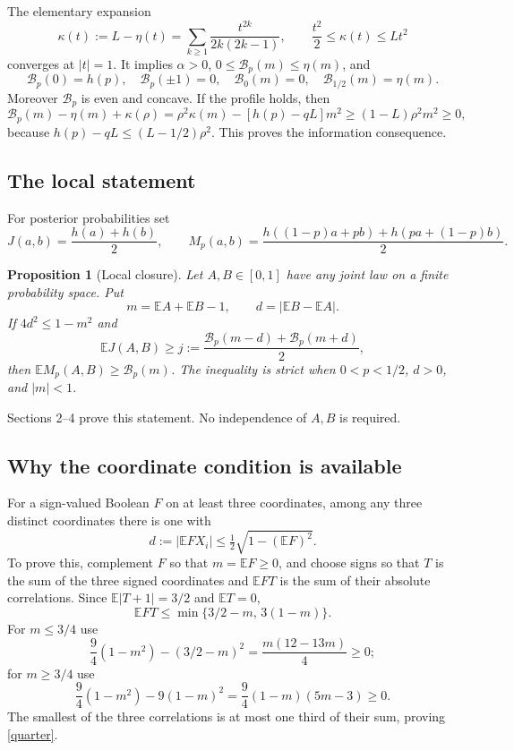 \documentclass[11pt]{article}
\newtheorem{proposition}[theorem]{Proposition}
\newcommand{\E}{\mathbb E}\newcommand{\Prb}{\mathbb P}
\newcommand{\B}{\mathcal B_p}\newcommand{\dd}{\,\mathrm d}
\numberwithin{equation}{section}
\begin{document}
The elementary expansion
\begin{equation}\label{entropyseries}
 \kappa(t):=L-\eta(t)=\sum_{k\ge1}\frac{t^{2k}}{2k(2k-1)},
 \qquad \frac{t^2}{2}\le\kappa(t)\le Lt^2
\end{equation}
converges at $|t|=1$. It implies $\alpha>0$, $0\le\B(m)\le\eta(m)$, and
\[
 \B(0)=h(p),\quad \B(\pm1)=0,\quad
 \mathcal B_0(m)=0,\quad\mathcal B_{1/2}(m)=\eta(m).
\]
Moreover $\B$ is even and concave. If the profile holds, then
\[
 \B(m)-\eta(m)+\kappa(\rho)
 =\rho^2\kappa(m)-[h(p)-qL]m^2
 \ge(1-L)\rho^2m^2\ge0,
\]
because $h(p)-qL\le(L-1/2)\rho^2$. This proves the information consequence.

\subsection*{The local statement}
For posterior probabilities set
\[
 J(a,b)=\frac{h(a)+h(b)}2,\qquad
 M_p(a,b)=\frac{h((1-p)a+pb)+h(pa+(1-p)b)}2.
\]
\begin{proposition}[Local closure]\label{local}
Let $A,B\in[0,1]$ have any joint law on a finite probability space. Put
\[
 m=\E A+\E B-1,\qquad d=|\E B-\E A|.
\]
If $4d^2\le1-m^2$ and
\begin{equation}\label{budgethyp}
 \E J(A,B)\ge j:=\frac{\B(m-d)+\B(m+d)}2,
\end{equation}
then $\E M_p(A,B)\ge\B(m)$. The inequality is strict when $0<p<1/2$, $d>0$, and $|m|<1$.
\end{proposition}
Sections 2--4 prove this statement. No independence of $A,B$ is required.

\subsection*{Why the coordinate condition is available}
For a sign-valued Boolean $F$ on at least three coordinates, among any three distinct coordinates there is one with
\begin{equation}\label{quarter}
 d:=|\E FX_i|\le\tfrac12\sqrt{1-(\E F)^2}.
\end{equation}
To prove this, complement $F$ so that $m=\E F\ge0$, and choose signs so that $T$ is the sum of the three signed coordinates and $\E FT$ is the sum of their absolute correlations. Since $\E|T+1|=3/2$ and $\E T=0$,
\[
 \E FT\le\min\{3/2-m,\,3(1-m)\}.
\]
For $m\le3/4$ use
\[
 \frac94(1-m^2)-(3/2-m)^2=\frac{m(12-13m)}4\ge0;
\]
for $m\ge3/4$ use
\[
 \frac94(1-m^2)-9(1-m)^2=\frac94(1-m)(5m-3)\ge0.
\]
The smallest of the three correlations is at most one third of their sum, proving \eqref{quarter}.
\end{document}
